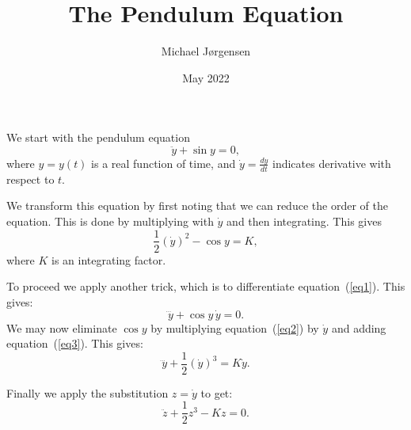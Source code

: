 \documentclass[12pt,oneside,a4paper]{article}
\title{The Pendulum Equation}
\date{May 2022}
\author{Michael Jørgensen}
\newcommand{\be}{\begin{equation}}
\newcommand{\ee}{\end{equation}}
\begin{document}
\maketitle

We start with the pendulum equation
\be
\ddot y + \sin y = 0,
\label{eq1}
\ee
where $y=y(t)$ is a real function of time, and $\dot y = \frac{dy}{dt}$
indicates derivative with respect to $t$.

We transform this equation by first noting that we can reduce the order of the
equation. This is done by multiplying with $\dot y$ and then integrating.
This gives
\be
\frac12 (\dot y)^2 - \cos y = K,
\label{eq2}
\ee
where $K$ is an integrating factor.

To proceed we apply another trick, which is to differentiate
equation~(\ref{eq1}).  This gives:
\be
\dddot y + \cos y \,\dot y = 0.
\label{eq3}
\ee
We may now eliminate $\cos y$ by multiplying equation~(\ref{eq2}) by $\dot y$
and adding equation~(\ref{eq3}). This gives:
\be
\dddot y + \frac12 (\dot y)^3 = K\dot y.
\ee

Finally we apply the substitution $z=\dot y$ to get:
\be
\ddot z + \frac12 z^3 - Kz = 0.
\ee
\end{document}
